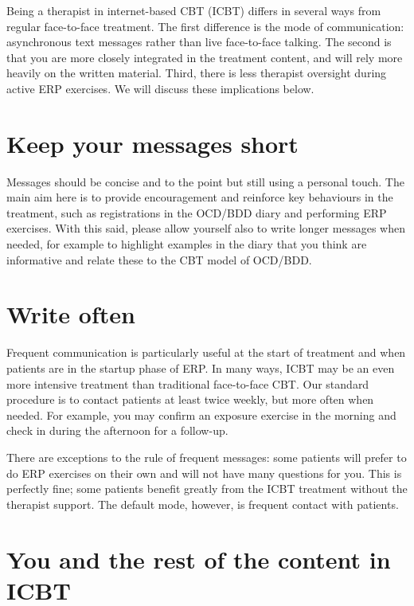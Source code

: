 \documentclass[]{book}
\theoremstyle{definition}
\theoremstyle{definition}
\theoremstyle{definition}
\theoremstyle{remark}
\begin{document}
Being a therapist in internet-based CBT (ICBT) differs in several ways
from regular face-to-face treatment. The first difference is the mode of
communication: asynchronous text messages rather than live face-to-face
talking. The second is that you are more closely integrated in the
treatment content, and will rely more heavily on the written material.
Third, there is less therapist oversight during active ERP exercises. We
will discuss these implications below.

\hypertarget{keep-your-messages-short}{%
\section{Keep your messages short}\label{keep-your-messages-short}}

Messages should be concise and to the point but still using a personal
touch. The main aim here is to provide encouragement and reinforce key
behaviours in the treatment, such as registrations in the OCD/BDD diary
and performing ERP exercises. With this said, please allow yourself also
to write longer messages when needed, for example to highlight examples
in the diary that you think are informative and relate these to the CBT
model of OCD/BDD.

\hypertarget{write-often}{%
\section{Write often}\label{write-often}}

Frequent communication is particularly useful at the start of treatment
and when patients are in the startup phase of ERP. In many ways, ICBT
may be an even more intensive treatment than traditional face-to-face
CBT. Our standard procedure is to contact patients at least twice
weekly, but more often when needed. For example, you may confirm an
exposure exercise in the morning and check in during the afternoon for a
follow-up.

There are exceptions to the rule of frequent messages: some patients
will prefer to do ERP exercises on their own and will not have many
questions for you. This is perfectly fine; some patients benefit greatly
from the ICBT treatment without the therapist support. The default mode,
however, is frequent contact with patients.

\hypertarget{you-and-the-rest-of-the-content-in-icbt}{%
\section{You and the rest of the content in
ICBT}\label{you-and-the-rest-of-the-content-in-icbt}}
\end{document}
